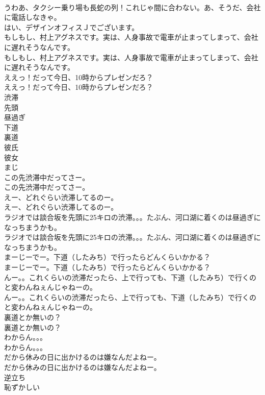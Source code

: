 \documentclass[8pt]{extreport}
\begin{document}
\begin{CJK}{UTF8}{min}
\\	うわあ、タクシー乗り場も長蛇の列！これじゃ間に合わない。あ、そうだ、会社に電話しなきゃ。 
\\	はい、デザインオフィスＪでございます。 
\\	もしもし、村上アグネスです。実は、人身事故で電車が止まってしまって、会社に遅れそうなんです。	
\\	もしもし、村上アグネスです。実は、人身事故で電車が止まってしまって、会社に遅れそうなんです。 
\\	ええっ！だって今日、10時からプレゼンだろ？	
\\	ええっ！だって今日、10時からプレゼンだろ？ 
\\	渋滞
\\	先頭
\\	昼過ぎ
\\	下道
\\	裏道
\\	彼氏
\\	彼女
\\	まじ
\\	この先渋滞中だってさー。	
\\	この先渋滞中だってさー。 
\\	えー、どれぐらい渋滞してるのー。	
\\	えー、どれぐらい渋滞してるのー。 
\\	ラジオでは談合坂を先頭に25キロの渋滞。。。たぶん、河口湖に着くのは昼過ぎになっちまうかも。	
\\	ラジオでは談合坂を先頭に25キロの渋滞。。。たぶん、河口湖に着くのは昼過ぎになっちまうかも。 
\\	まーじーでー。下道（したみち）で行ったらどんくらいかかる？	
\\	まーじーでー。下道（したみち）で行ったらどんくらいかかる？ 
\\	んー。。これくらいの渋滞だったら、上で行っても、下道（したみち）で行くのと変わんねぇんじゃねーの。	
\\	んー。。これくらいの渋滞だったら、上で行っても、下道（したみち）で行くのと変わんねぇんじゃねーの。 
\\	裏道とか無いの？	
\\	裏道とか無いの？ 
\\	わからん。。。	
\\	わからん。。。 
\\	だから休みの日に出かけるのは嫌なんだよねー。	
\\	だから休みの日に出かけるのは嫌なんだよねー。 
\\	逆立ち
\\	恥ずかしい

\end{CJK}
\end{document}
